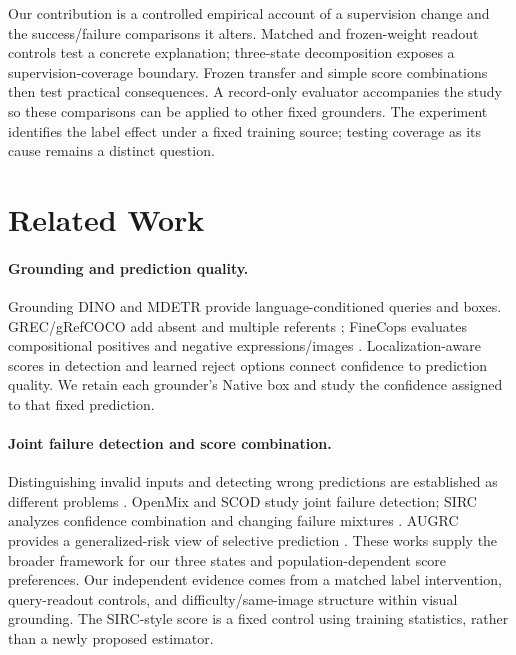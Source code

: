 \documentclass[10pt,twocolumn,letterpaper]{article}
\begin{document}
Our contribution is a controlled empirical account of a supervision change
and the success/failure comparisons it alters. Matched and frozen-weight
readout controls test a concrete explanation; three-state decomposition
exposes a supervision-coverage boundary. Frozen transfer and simple score
combinations then test practical consequences. A record-only evaluator
accompanies the study so these comparisons can be applied to other fixed
grounders. The experiment identifies the label effect under a fixed
training source; testing coverage as its cause remains a distinct question.

\section{Related Work}
\paragraph{Grounding and prediction quality.}
Grounding DINO \cite{liu2025groundingdino} and MDETR
\cite{kamath2021mdetr} provide language-conditioned queries and boxes.
GREC/gRefCOCO add absent and multiple referents
\cite{he2023grec,liu2023gres}; FineCops evaluates compositional positives
and negative expressions/images \cite{liu2024finecops}.
Localization-aware scores in detection \cite{li2020gfl} and learned
reject options \cite{geifman2019selectivenet} connect confidence to
prediction quality. We retain each grounder's Native box and study the
confidence assigned to that fixed prediction.

\paragraph{Joint failure detection and score combination.}
Distinguishing invalid inputs and detecting wrong predictions are established
as different problems \cite{jaeger2023failure}. OpenMix
\cite{zhu2023openmix} and SCOD \cite{narasimhan2024scod} study joint
failure detection; SIRC analyzes confidence combination and changing
failure mixtures \cite{xia2024sirc}. AUGRC provides a generalized-risk
view of selective prediction \cite{traub2024augrc}. These works supply
the broader framework for our three states and population-dependent
score preferences. Our independent evidence comes from a matched label
intervention, query-readout controls, and difficulty/same-image structure
within visual grounding. The SIRC-style score is a fixed control using
training statistics, rather than a newly proposed estimator.
\end{document}
